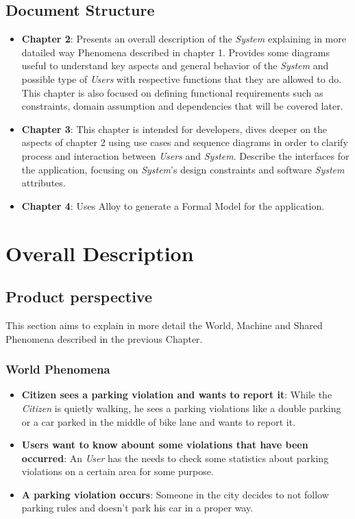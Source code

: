 \documentclass{article}
\begin{document}
\subsection{Document Structure}
\begin{itemize}
    \item \textbf{Chapter 2}: Presents an overall description of the \textit{System} explaining in more datailed 
    way Phenomena described in chapter 1. Provides some diagrams useful to understand key aspects and 
    general behavior of the \textit{System} and possible type of \textit{Users} with respective functions that they are allowed to do. 
    This chapter is also focused on defining functional requirements such
    as constraints, domain assumption and dependencies that will be covered later.    
    \item \textbf{Chapter 3}: This chapter is intended for developers, dives deeper on the aspects of chapter 2 using 
    use cases and sequence diagrams in order to clarify process and interaction between \textit{Users} and \textit{System}. 
    Describe the interfaces for the application, focusing on \textit{System}'s design constraints and software \textit{System} attributes.  
    \item \textbf{Chapter 4}: Uses Alloy to generate a Formal Model for the application.
\end{itemize}

\clearpage

\section{Overall Description}

\subsection{Product perspective}
This section aims to explain in more detail the World, Machine and Shared Phenomena described in the 
previous Chapter. 

\subsubsection{World Phenomena}
\begin{itemize}
    \item \textbf{Citizen sees a parking violation and wants to report it}:
    While the \textit{Citizen} is quietly walking, he sees a parking violations like a double parking or a car
    parked in the middle of bike lane and wants to report it.
    \item \textbf{Users want to know abount some violations that have been occurred}:
    An \textit{User} has the needs to check some statistics about parking violations on a certain area
    for some purpose.
    \item \textbf{A parking violation occurs}:
    Someone in the city decides to not follow parking rules and doesn't park his car in a proper way.
\end{itemize}
\end{document}
